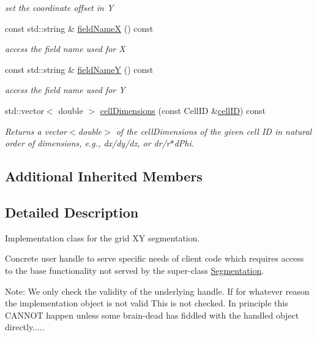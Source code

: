 \begin{DoxyCompactItemize}
\begin{DoxyCompactList}\small\item\em set the coordinate offset in Y \end{DoxyCompactList}\item 
const std\+::string \& \hyperlink{class_d_d4hep_1_1_geometry_1_1_cartesian_grid_x_y_a569c1e0eaea5aad57e6578fd56acbd2b}{field\+NameX} () const
\begin{DoxyCompactList}\small\item\em access the field name used for X \end{DoxyCompactList}\item 
const std\+::string \& \hyperlink{class_d_d4hep_1_1_geometry_1_1_cartesian_grid_x_y_a0e8cadbaedfd26563e15d5c6cd5bf148}{field\+NameY} () const
\begin{DoxyCompactList}\small\item\em access the field name used for Y \end{DoxyCompactList}\item 
std\+::vector$<$ double $>$ \hyperlink{class_d_d4hep_1_1_geometry_1_1_cartesian_grid_x_y_ad292248c9faec2a13074ede81d74b8dc}{cell\+Dimensions} (const Cell\+ID \&\hyperlink{class_d_d4hep_1_1_geometry_1_1_cartesian_grid_x_y_a83c05bd3b39fab868f02b6e44e206a26}{cell\+ID}) const
\begin{DoxyCompactList}\small\item\em Returns a vector$<$double$>$ of the cell\+Dimensions of the given cell ID in natural order of dimensions, e.\+g., dx/dy/dz, or dr/r$\ast$d\+Phi. \end{DoxyCompactList}\end{DoxyCompactItemize}
\subsection*{Additional Inherited Members}


\subsection{Detailed Description}
Implementation class for the grid XY segmentation. 

Concrete user handle to serve specific needs of client code which requires access to the base functionality not served by the super-\/class \hyperlink{class_d_d4hep_1_1_geometry_1_1_segmentation}{Segmentation}.

Note\+: We only check the validity of the underlying handle. If for whatever reason the implementation object is not valid This is not checked. In principle this C\+A\+N\+N\+OT happen unless some brain-\/dead has fiddled with the handled object directly.....


